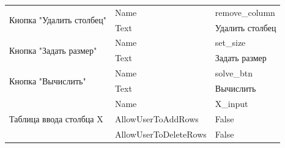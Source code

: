 \begin{table}[H]
\begin{tabular}{|l|l|l|}
\multirow{2}{*}{Кнопка "Удалить столбец"}                                        & Name                                                                           & remove\_column                                                                \\ \cline{2-3} 
                                                                                 & Text                                                                           & Удалить столбец                                                               \\ \hline
\multirow{2}{*}{Кнопка "Задать размер"}                                          & Name                                                                           & set\_size                                                                     \\ \cline{2-3} 
                                                                                 & Text                                                                           & Задать размер                                                                 \\ \hline
\multirow{2}{*}{Кнопка "Вычислить"}                                              & Name                                                                           & solve\_btn                                                                    \\ \cline{2-3} 
                                                                                 & Text                                                                           & Вычислить                                                                     \\ \hline
\multirow{3}{*}{Таблица ввода столбца X}                                         & Name                                                                           & X\_input                                                                      \\ \cline{2-3} 
                                                                                 & AllowUserToAddRows                                                             & False                                                                         \\ \cline{2-3} 
                                                                                 & AllowUserToDeleteRows                                                          & False                                                                         \\ \hline

\end{tabular}
\end{table}
